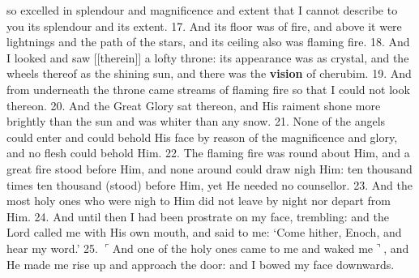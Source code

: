 so excelled in splendour and magnificence and extent
that I cannot describe to you its splendour and its
extent. 17. And its floor was of fire, and above it
were lightnings and the path of the stars, and its
ceiling also was flaming fire. 18. And I looked and
saw [[therein]] a lofty throne: its appearance was as
crystal, and the wheels thereof as the shining sun,
and there was the \textbf{vision} of cherubim. 19. And
from underneath the throne came streams of flaming
fire so that I could not look thereon. 20. And the
Great Glory sat thereon, and His raiment shone more
brightly than the sun and was whiter than any snow.
21. None of the angels could enter and could behold
His face by reason of the magnificence and glory, and
no flesh could behold Him. 22. The flaming fire
was round about Him, and a great fire stood before
Him, and none around could draw nigh Him: ten
thousand times ten thousand (stood) before Him,
yet He needed no counsellor. 23. And the most
holy ones who were nigh to Him did not leave by
night nor depart from Him. 24. And until then I
had been prostrate on my face, trembling: and the
Lord called me with His own mouth, and said to me:
‘Come hither, Enoch, and hear my word.’ 25. $\ulcorner$And
one of the holy ones came to me and waked me$\urcorner$,
and He made me rise up and approach the door:
and I bowed my face downwards.

